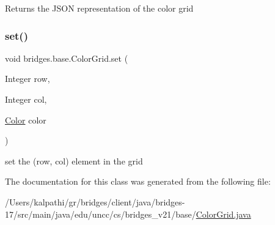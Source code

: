 \begin{DoxyReturn}{Returns}
the J\+S\+ON representation of the color grid 
\end{DoxyReturn}
\mbox{\label{classbridges_1_1base_1_1_color_grid_a93b29af9bb21b2bf6e52bc3fda9ff34a}} 
\subsubsection{\texorpdfstring{set()}{set()}}
{\footnotesize\ttfamily void bridges.\+base.\+Color\+Grid.\+set (\begin{DoxyParamCaption}\item[{Integer}]{row,  }\item[{Integer}]{col,  }\item[{\mbox{\hyperlink{classbridges_1_1base_1_1_color}{Color}}}]{color }\end{DoxyParamCaption})}

set the (row, col) element in the grid 

The documentation for this class was generated from the following file\+:\begin{DoxyCompactItemize}
\item 
/\+Users/kalpathi/gr/bridges/client/java/bridges-\/17/src/main/java/edu/uncc/cs/bridges\+\_\+v21/base/\mbox{\hyperlink{_color_grid_8java}{Color\+Grid.\+java}}\end{DoxyCompactItemize}
